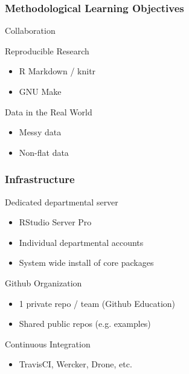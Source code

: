 \documentclass[12pt]{beamer}
\begin{document}
\begin{frame}
\frametitle{Methodological Learning Objectives}

Collaboration

\vspace{3mm}

Reproducible Research
\begin{itemize}
\item R Markdown / knitr
\item GNU Make
\end{itemize}

\vspace{3mm}

Data in the Real World
\begin{itemize}
\item Messy data
\item Non-flat data
\end{itemize}



\end{frame}


\begin{frame}
\frametitle{Infrastructure}

\vspace{-5mm}

Dedicated departmental server
\begin{itemize}
\item RStudio Server Pro
\item Individual departmental accounts
\item System wide install of core packages
\end{itemize}

\vspace{3mm}

Github Organization
\begin{itemize}
\item 1 private repo / team (Github Education)
\item Shared public repos (e.g. examples)
\end{itemize}

\vspace{3mm}

Continuous Integration
\begin{itemize}
\item TravisCI, Wercker, Drone, etc.
\end{itemize}

\end{frame}
\end{document}

